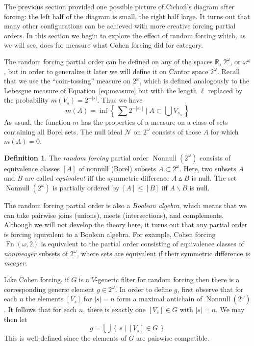 \documentclass[11pt,oneside]{amsbook}
\newcommand{\set}[1]{\left\{\,#1\,\right\}}
\newcommand{\RR}{\mathbb R}
\newcommand{\Null}{\mathcal N}
\DeclareMathOperator{\Fn}{Fn}
\DeclareMathOperator{\Nonnull}{Nonnull}
\theoremstyle{definition}
\theoremstyle{plain}
\theoremstyle{definition}
\newtheorem{defn}[thm]{Definition}
\theoremstyle{remark}
\numberwithin{equation}{section}
\numberwithin{figure}{section}
\begin{document}
The previous section provided one possible picture of Cicho\'n's diagram after forcing: the left half of the diagram is small, the right half large. It turns out that many other configurations can be achieved with more creative forcing partial orders. In this section we begin to explore the effect of random forcing which, as we will see, does for measure what Cohen forcing did for category.

The random forcing partial order can be defined on any of the spaces $\RR$, $2^\omega$, or $\omega^\omega$, but in order to generalize it later we will define it on Cantor space $2^\omega$. Recall that we use the ``coin-tossing'' measure on $2^\omega$, which is defined analogously to the Lebesgue measure of Equation~\eqref{eq:measure} but with the length $\ell$ replaced by the probability $m(V_s)=2^{-|s|}$. Thus we have
\[m(A)=\inf\set{\sum2^{-|s_n|}\mid A\subset\bigcup V_{s_n}}
\]
As usual, the function $m$ has the properties of a measure on a class of sets containing all Borel sets. The null ideal $\Null$ on $2^\omega$ consists of those $A$ for which $m(A)=0$.

\begin{defn}
  The \emph{random forcing} partial order $\Nonnull(2^\omega)$ consists of equivalence classes $[A]$ of nonnull (Borel) subsets $A\subset2^\omega$. Here, two subsets $A$ and $B$ are called \emph{equivalent} iff the symmetric difference $A\mathbin{\vartriangle} B$ is null. The set $\Nonnull(2^\omega)$ is partially ordered by $[A]\leq[B]$ iff $A\smallsetminus B$ is null.
\end{defn}

The random forcing partial order is also a \emph{Boolean algebra}, which means that we can take pairwise joins (unions), meets (intersections), and complements. Although we will not develop the theory here, it turns out that any partial order is forcing equivalent to a Boolean algebra. For example, Cohen forcing $\Fn(\omega,2)$ is equivalent to the partial order consisting of equivalence classes of \emph{nonmeager} subsets of $2^\omega$, where sets are equivalent if their symmetric difference is \emph{meager}.

Like Cohen forcing, if $G$ is a $V$-generic filter for random forcing then there is a corresponding generic element $g\in2^\omega$. In order to define $g$, first observe that for each $n$ the elements $[V_s]$ for $|s|=n$ form a maximal antichain of $\Nonnull(2^\omega)$. It follows that for each $n$, there is exactly one $[V_s]\in G$ with $|s|=n$. We may then let
\[g=\bigcup\set{s\mid [V_s]\in G}
\]
This is well-defined since the elements of $G$ are pairwise compatible.
\end{document}
